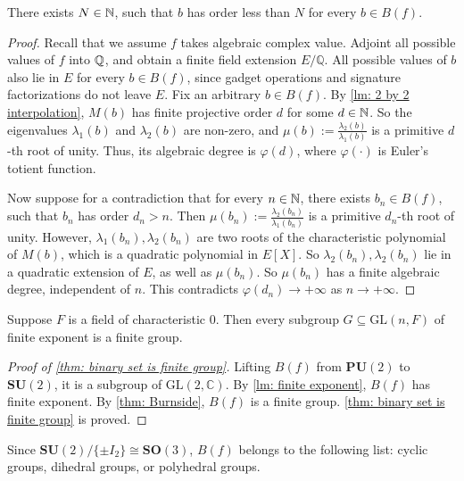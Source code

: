 \begin{lemma}\label{lm: finite exponent}
    There exists $N\in \mathbb{N}$, such that $b$ has order less than $N$ for every $b\in B(f)$. 
\end{lemma}
\begin{proof}
    Recall that we assume $f$ takes algebraic complex value. 
    Adjoint all possible values of $f$ into $\mathbb{Q}$, and obtain a finite field extension $E/\mathbb{Q}$.
    All possible values of $b$ also lie in $E$ for every $b\in B(f)$, since gadget operations and signature factorizations do not leave $E.$
    Fix an arbitrary $b\in B(f)$.
    By \cref{lm: 2 by 2 interpolation}, $M(b)$ has finite projective order $d$ for some $d\in \mathbb{N}$.
    So the eigenvalues $\lambda_1(b)$ and $\lambda_2(b)$ are non-zero, and $\mu(b):=\frac{\lambda_2(b)}{\lambda_1(b)}$ is a primitive $d$-th root of unity.
    Thus, its algebraic degree is $\varphi(d)$, where $\varphi(\cdot)$ is Euler's totient function.

    Now suppose for a contradiction that for every $n\in\mathbb{N}$, there exists $b_n\in B(f)$, such that $b_n$ has order $d_n>n.$ 
    Then $\mu(b_n):=\frac{\lambda_2(b_n)}{\lambda_1(b_n)}$ is a primitive $d_n$-th root of unity.
    However, $\lambda_1(b_n),\lambda_2(b_n)$ are two roots of the characteristic polynomial  of $M(b)$, which is a quadratic polynomial in $E[X]$.
    So $\lambda_2(b_n),\lambda_2(b_n)$ lie in a quadratic extension of $E$, as well as $\mu(b_n)$.
    So $\mu(b_n)$ has a finite algebraic degree, independent of $n$.
    This contradicts $\varphi(d_n)\to +\infty$ as $n\to +\infty.$
\end{proof}
\begin{theorem}\label{thm: Burnside}
   Suppose $F$ is a field of characteristic 0.
   Then every subgroup $G \subseteq \mathrm{GL}(n,F)$ of finite exponent is a finite group.
\end{theorem}

\begin{proof}[Proof of \cref{thm: binary set is finite group}]
    Lifting $B(f)$ from $\mathbf{PU}(2)$ to $\mathbf{SU}(2)$, it is a subgroup of  $\mathrm{GL(2,\mathbb{C})}$.
    By \cref{lm: finite exponent}, $B(f)$ has finite exponent.
    By \cref{thm: Burnside}, $B(f)$ is a finite group.
    \cref{thm: binary set is finite group} is proved.
\end{proof}
Since $\mathbf{SU}(2)/\{\pm I_2\}\cong \mathbf{SO}(3)$, $B(f)$ belongs to the following list: cyclic groups, dihedral groups, or polyhedral groups.
